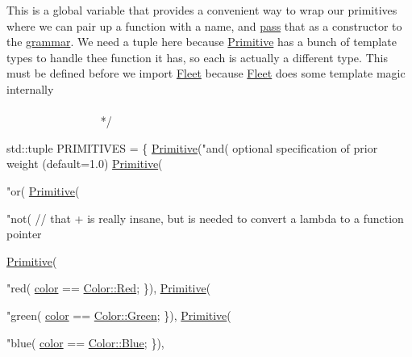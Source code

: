 \begin{DoxyCode}
    This is a global variable that provides a convenient way to wrap our primitives
    where we can pair up a \textcolor{keyword}{function} with a name, and \hyperlink{_miscellaneous_8h_a9f2587d1070b8924b276ba83988d3667}{pass} that as a constructor
    to the \hyperlink{class_l_o_t_hypothesis_aa7cf638b5d680794e33aa5eb4bd36b09}{grammar}. We need a tuple here because \hyperlink{struct_primitive}{Primitive} has a bunch of \textcolor{keyword}{template}
    types to handle thee \textcolor{keyword}{function} it has, so each is actually a different type.
    This must be defined before we \textcolor{keyword}{import} \hyperlink{namespace_fleet}{Fleet} because \hyperlink{namespace_fleet}{Fleet} does some \textcolor{keyword}{template}
    magic internally
   ~~~~~~~~~~~~~~~~~~~~~~~~~~~~~~~~~~~~~~~~~~~~~~~~~~~~~~~~~~~~~~~~~~~~~~~~~~~~~~~~~~~~~~~~ */




std::tuple PRIMITIVES = \{
    \hyperlink{struct_primitive}{Primitive}(\textcolor{stringliteral}{"and(%
       optional specification of prior weight (default=1.0)}
    \hyperlink{struct_primitive}{Primitive}(\textcolor{stringliteral}{"or(%
    \hyperlink{struct_primitive}{Primitive}(\textcolor{stringliteral}{"not(%
    \textcolor{comment}{// that + is really insane, but is needed to convert a lambda to a function pointer}

    \hyperlink{struct_primitive}{Primitive}(\textcolor{stringliteral}{"red(%
      \hyperlink{struct_object_a3ed85d6e0b0b62ff2501d421cb55c5e9}{color} == \hyperlink{_rational_rules_2_main_8cpp_ab87bacfdad76e61b9412d7124be44c1caee38e4d5dd68c4e440825018d549cb47}{Color::Red}; \}),
    \hyperlink{struct_primitive}{Primitive}(\textcolor{stringliteral}{"green(%
      \hyperlink{struct_object_a3ed85d6e0b0b62ff2501d421cb55c5e9}{color} == \hyperlink{_rational_rules_2_main_8cpp_ab87bacfdad76e61b9412d7124be44c1cad382816a3cbeed082c9e216e7392eed1}{Color::Green}; \}),
    \hyperlink{struct_primitive}{Primitive}(\textcolor{stringliteral}{"blue(%
      \hyperlink{struct_object_a3ed85d6e0b0b62ff2501d421cb55c5e9}{color} == \hyperlink{_rational_rules_2_main_8cpp_ab87bacfdad76e61b9412d7124be44c1ca9594eec95be70e7b1710f730fdda33d9}{Color::Blue}; \}),

}}}}}
\end{DoxyCode}
